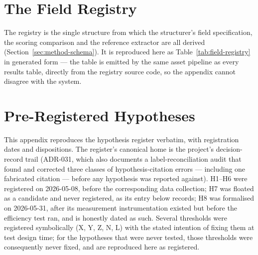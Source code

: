 
\chapter{The Field Registry}
\label{app:registry}

The registry is the single structure from which the structurer's field
specification, the scoring comparison and the reference extractor are all derived
(Section~\ref{sec:method-schema}). It is reproduced here as Table~\ref{tab:field-registry}
in generated form --- the table is emitted by the same asset pipeline as every results
table, directly from the registry source code, so the appendix cannot disagree with
the system.



\chapter{Pre-Registered Hypotheses}
\label{app:hypotheses}

This appendix reproduces the hypothesis register verbatim, with registration dates and
dispositions. The register's canonical home is the project's decision-record trail
(ADR-031, which also documents a label-reconciliation audit that found and corrected
three classes of hypothesis-citation errors --- including one fabricated citation ---
before any hypothesis was reported against). H1--H6 were registered on 2026-05-08,
before the corresponding data collection; H7 was floated as a candidate and never
registered, as its entry below records; H8 was formalised on 2026-05-31, after its
measurement instrumentation existed but before the efficiency test ran, and is
honestly dated as such. Several thresholds were registered symbolically (X, Y, Z, N,
L) with the stated intention of fixing them at test design time; for the hypotheses
that were never tested, those thresholds were consequently never fixed, and are
reproduced here as registered.

